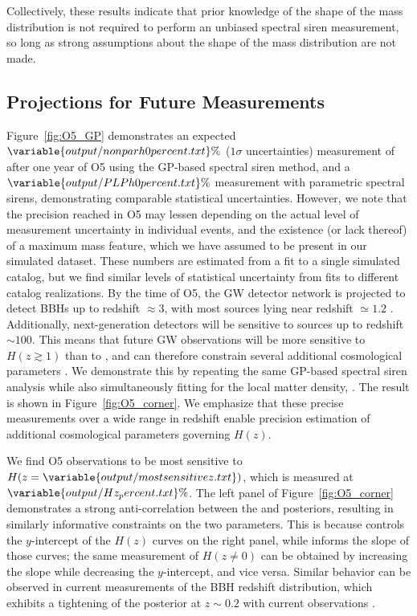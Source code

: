 \documentclass[preprint2,linenumbers]{aastex631}
\begin{document}
Collectively, these results indicate that prior knowledge of the shape of the mass distribution is not required to perform an unbiased spectral siren measurement, so long as strong assumptions about the shape of the mass distribution are not made.

\subsection{Projections for Future Measurements}
Figure~\ref{fig:O5_GP} demonstrates an expected $\variable{output/nonparh0percent.txt}\%$ ($1\sigma$ uncertainties) measurement of \Ho{} after one year of \ac{O5} using the \ac{GP}-based spectral siren method, and a $\variable{output/PLPh0percent.txt}\%$ measurement with parametric spectral sirens, demonstrating comparable statistical uncertainties.
However, we note that the precision reached in \ac{O5} may lessen depending on the actual level of measurement uncertainty in individual events, and the existence (or lack thereof) of a maximum mass feature, which we have assumed to be present in our simulated dataset.
These numbers are estimated from a fit to a single simulated catalog, but we find similar levels of statistical uncertainty from fits to different catalog realizations.
By the time of \ac{O5}, the \ac{GW} detector network is projected to detect \acp{BBH} up to redshift $\approx 3$, with most sources lying near redshift $\simeq 1.2$ \citep{chen_distance_2021}.
Additionally, next-generation detectors will be sensitive to sources up to redshift $\sim 100$.
This means that future \ac{GW} observations will be more sensitive to $H(z\gtrsim1)$ than to \Ho, and can therefore constrain several additional cosmological parameters \citep{Chen:2024gdn}.
We demonstrate this by repeating the same \ac{GP}-based spectral siren analysis while also simultaneously fitting for the local matter density, \Omm.
The result is shown in Figure~\ref{fig:O5_corner}.
We emphasize that these precise measurements over a wide range in redshift enable precision estimation of additional cosmological parameters governing $H(z)$.

We find \ac{O5} observations to be most sensitive to $H(z=\variable{output/mostsensitivez.txt})$, which is measured at $\variable{output/Hz_percent.txt}\%$.
The left panel of Figure~\ref{fig:O5_corner} demonstrates a strong anti-correlation between the \Omm{} and \Ho{} posteriors, resulting in similarly informative constraints on the two parameters.
This is because \Ho{} controls the $y$-intercept of the $H(z)$ curves on the right panel, while \Omm{} informs the slope of those curves; the same measurement of $H(z\neq0)$ can be obtained by increasing the slope while decreasing the $y$-intercept, and vice versa.
Similar behavior can be observed in current measurements of the \ac{BBH} redshift distribution, which exhibits a tightening of the posterior at $z\sim0.2$ with current observations \citep{abbott_population_2023, callister_parameter-free_2023}.
\end{document}
